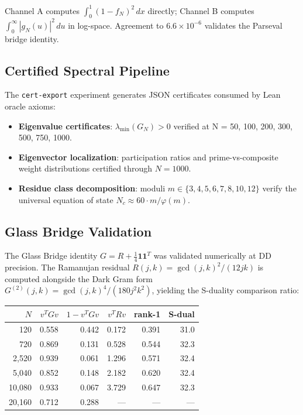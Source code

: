 \documentclass[11pt,a4paper]{article}
\begin{document}
Channel A computes $\int_0^1(1-f_N)^2\,dx$ directly; Channel B
computes $\int_0^\infty|g_N(u)|^2\,du$ in log-space. Agreement to
$6.6 \times 10^{-6}$ validates the Parseval bridge identity.

\subsection{Certified Spectral Pipeline}

The \texttt{cert-export} experiment generates JSON certificates
consumed by Lean oracle axioms:
\begin{itemize}
  \item \textbf{Eigenvalue certificates}: $\lambda_{\min}(G_N) > 0$
    verified at N = 50, 100, 200, 300, 500, 750, 1000.
  \item \textbf{Eigenvector localization}: participation ratios
    and prime-vs-composite weight distributions certified through
    $N = 1000$.
  \item \textbf{Residue class decomposition}: moduli
    $m \in \{3,4,5,6,7,8,10,12\}$ verify the universal equation
    of state $N_c \approx 60 \cdot m/\varphi(m)$.
\end{itemize}

\subsection{Glass Bridge Validation}

The Glass Bridge identity $G = R + \frac{1}{4}\mathbf{1}\mathbf{1}^T$
was validated numerically at DD precision. The Ramanujan residual
$R(j,k) = \gcd(j,k)^2/(12jk)$ is computed alongside the Dark Gram
form $G^{(2)}(j,k) = \gcd(j,k)^4/(180j^2k^2)$, yielding the
S-duality comparison ratio:

\begin{center}
\begin{tabular}{@{}rrrrrr@{}}
\toprule
$N$ & $v^TGv$ & $1 - v^TGv$ & $v^TRv$ & rank-1 & S-dual \\
\midrule
120 & 0.558 & 0.442 & 0.172 & 0.391 & 31.0 \\
720 & 0.869 & 0.131 & 0.528 & 0.544 & 32.3 \\
2{,}520 & 0.939 & 0.061 & 1.296 & 0.571 & 32.4 \\
5{,}040 & 0.852 & 0.148 & 2.182 & 0.620 & 32.4 \\
10{,}080 & 0.933 & 0.067 & 3.729 & 0.647 & 32.3 \\
20{,}160 & 0.712 & 0.288 & ---\rlap{$^\dagger$} & --- & --- \\
\bottomrule
\end{tabular}
\end{center}
\end{document}
